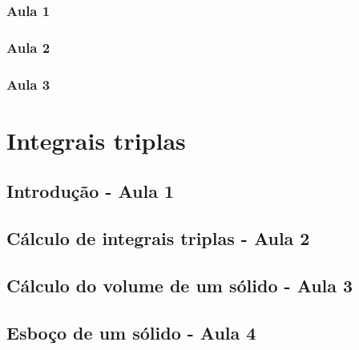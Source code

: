 \documentclass[
	12pt,				%
	openright,			%
	twoside,			%
	a4paper,			%
	english,			%
	french,				%
	spanish,			%
	brazil,				%
]{abntex2}
\begin{document}
	\subsection{Aula 1}
		
	\subsection{Aula 2}
			
	\subsection{Aula 3}
		

\chapter{Integrais triplas}\label{integrais_triplas}
	\section{Introdução - Aula 1}
				
	\section{Cálculo de integrais triplas - Aula 2}
			
	\section{Cálculo do volume de um sólido - Aula 3}
			
	\section{Esboço de um sólido - Aula 4}
		
	
	
	
\end{document}
